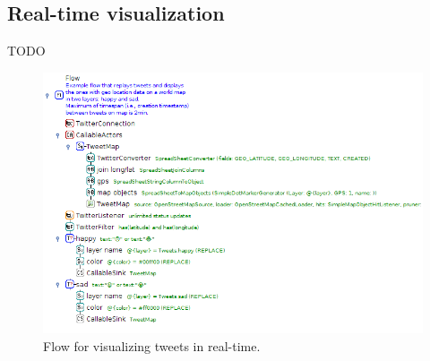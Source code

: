 \documentclass[a4paper,10pt]{book}
\begin{document}
\subsection{Real-time visualization}
TODO

\begin{figure}[htb]
  \centering
  \includegraphics[width=12.0cm]{images/visualize_tweets-realtime-flow.png}
  \caption{Flow for visualizing tweets in real-time.}
  \label{visualize_tweets-realtime-flow}
\end{figure}
\end{document}
